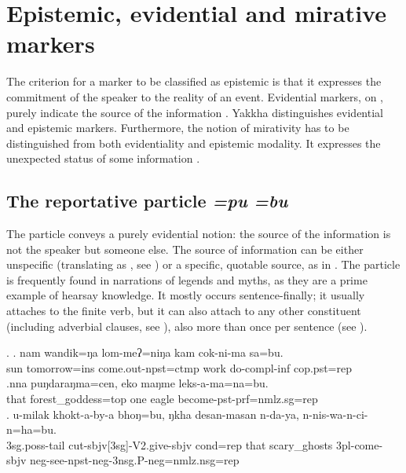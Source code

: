 	
\section{Epistemic, evidential and mirative markers}\label{ptcl-evid}

The criterion for a marker to be classified as epistemic is that it expresses the commitment of the speaker to the reality of an event. Evidential markers, on , purely indicate the source of the information \citep{Cornillie2009_Evidentiality}. Yakkha distinguishes evidential and epistemic markers. Furthermore, the notion of mirativity has to be distinguished from both evidentiality and epistemic modality. It expresses the unexpected status of some information \citep{DeLancey1997Mirativity}.  

\subsection{The reportative particle \emph{=pu \ti =bu}}\label{hearsay}
 
The  particle conveys a purely evidential notion: the source of the information is not the speaker but someone else. The source of information can be either unspecific (translating as , see \Next) or a specific, quotable source, as in \NNext. The particle is frequently found in narrations of legends and myths, as they are a prime example of hearsay know\-ledge. It mostly occurs sentence-finally; it usually attaches to the finite verb, but it can also attach to any other constituent (including adverbial clauses, see \Next[c]), also more than once per sentence (see \NNext[b]). 
 
 \ex. \ag. nam wandik=ŋa       lom-meʔ=niŋa                kam  cok-ni-ma           sa=bu.\\
 sun tomorrow{\sc =ins} come.out{\sc [3sg]-npst=ctmp} work do{\sc -compl-inf} {\sc cop.pst=rep}\\
 \bg.nna  puŋdaraŋma=cen,     eko maŋme leks-a-ma=na=bu.\\
that forest\_goddess{\sc =top} one eagle become{\sc [3sg]-pst-prf=nmlz.sg=rep}\\
\bg. u-milak          khokt-a-by-a                                bhoŋ=bu,    ŋkha desan-masan  n-da-ya,            n-nis-wa-n-ci-n=ha=bu.\\
{\sc 3sg.poss-}tail  cut{\sc -sbjv[3sg]-V2.give-sbjv} {\sc cond=rep}  that  scary\_ghosts {\sc 3pl-}come{\sc -sbjv} {\sc neg-}see{\sc -npst-neg-3nsg.P-neg=nmlz.nsg=rep}\\
 


